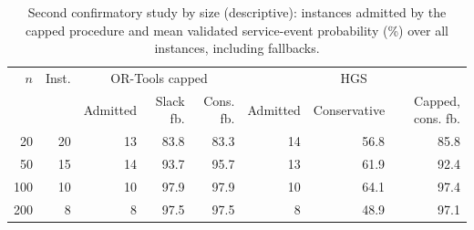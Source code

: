 \begin{table}[htbp]
\centering
\footnotesize
\caption{Second confirmatory study by size (descriptive): instances admitted by the capped procedure and mean validated service-event probability (\%) over all instances, including fallbacks.}
\label{tab:study2-size}
\begin{tabular}{@{}rrrrrrrr@{}}
\toprule
$n$ & Inst. & \multicolumn{3}{c}{OR-Tools capped} & \multicolumn{3}{c}{HGS} \\ & & Admitted & Slack fb. & Cons. fb. & Admitted & Conservative & Capped, cons. fb.\\
\midrule
20 & 20 & 13 & 83.8 & 83.3 & 14 & 56.8 & 85.8\\
50 & 15 & 14 & 93.7 & 95.7 & 13 & 61.9 & 92.4\\
100 & 10 & 10 & 97.9 & 97.9 & 10 & 64.1 & 97.4\\
200 & 8 & 8 & 97.5 & 97.5 & 8 & 48.9 & 97.1\\
\bottomrule
\end{tabular}
\end{table}
